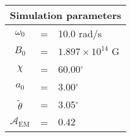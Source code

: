 \begin{tabular}{ccl}
\multicolumn{3}{c}{Simulation parameters} \\
\hline
$\omega_0$  &=& 10.0 rad/s\\
$B_0$  &=& ${1.897}\times 10^{14}$ G \\
$\chi$  &=& 60.00$^{\circ}$ \\
$a_0$ &=& 3.00$^{\circ}$ \\
$\tilde{\theta}$ &= & 3.05$^{\circ}$ \\
$\mathcal{A}_{\mathrm{EM}}$ &= & $0.42$
\end{tabular}